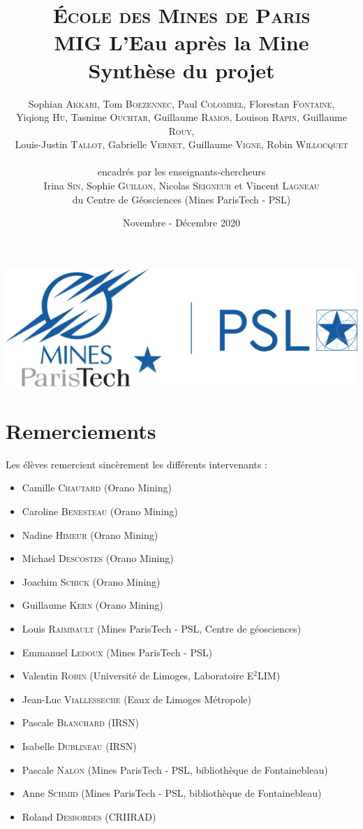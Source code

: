 \documentclass{article}
\title{ \textbf{ {\color{couleurmines}
\Huge{\textsc{École des Mines de Paris}}\\
\vspace{1.5 cm}
MIG L'Eau après la Mine\\\vspace{1 cm}Synthèse du projet}}
\vspace{1 cm}
}
\author{%
Sophian \textsc{Akkari},
Tom \textsc{Boezennec}, 
Paul \textsc{Colombel}, 
Florestan \textsc{Fontaine},\\
Yiqiong \textsc{Hu}, 
Tasnime \textsc{Ouchtar}, 
Guillaume \textsc{Ramos}, 
Louison \textsc{Rapin}, 
Guillaume \textsc{Rouy},\\ 
Louis-Justin \textsc{Tallot}, 
Gabrielle \textsc{Vernet}, 
Guillaume \textsc{Vigne}, 
Robin \textsc{Willocquet}\\
\\ encadrés par les enseignants-chercheurs \\
Irina \textsc{Sin}, 
Sophie \textsc{Guillon}, 
Nicolas \textsc{Seigneur}
et Vincent \textsc{Lagneau} \\
du Centre de Géosciences (Mines ParisTech - PSL)}
\date{\vspace{2 cm}Novembre - Décembre 2020}
\begin{document}

\maketitle
\thispagestyle{empty}
\vspace{2 cm}
\begin{center}
    \includegraphics[width = 0.4\linewidth]{logoMPT.png}
\end{center}
\newpage
{}

\section*{Remerciements}
Les élèves remercient sincèrement les différents intervenants : 
\begin{itemize}
    \item Camille \textsc{Chautard} (Orano Mining)
    \item Caroline \textsc{Benesteau} (Orano Mining)
    \item Nadine \textsc{Himeur} (Orano Mining)
    \item Michael \textsc{Descostes} (Orano Mining)
    \item Joachim \textsc{Schick} (Orano Mining)
    \item Guillaume \textsc{Kern} (Orano Mining)
    \item Louis \textsc{Raimbault} (Mines ParisTech - PSL, Centre de géosciences) 
    \item  Emmanuel \textsc{Ledoux} (Mines ParisTech - PSL)
    \item Valentin \textsc{Robin} (Université de Limoges, Laboratoire E$^2$LIM) 
    \item Jean-Luc \textsc{Viallesseche} (Eaux de Limoges Métropole)
    \item Pascale \textsc{Blanchard} (IRSN)  
    \item Isabelle \textsc{Dublineau} (IRSN)    
    \item  Pascale \textsc{Nalon} (Mines ParisTech - PSL, bibliothèque de Fontainebleau)
    \item Anne \textsc{Schmid} (Mines ParisTech - PSL, bibliothèque de Fontainebleau)
    \item Roland \textsc{Desbordes (CRIIRAD)}
\end{itemize}
\end{document}
